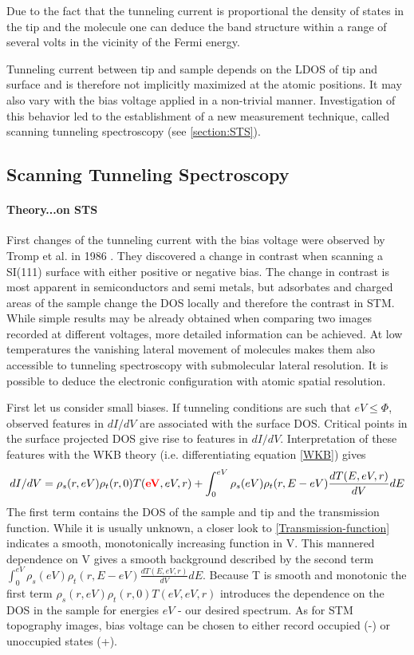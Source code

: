 Due to the fact that the tunneling current is proportional the density of states in the tip and the molecule one can deduce the band structure within a range of several volts in the vicinity of the Fermi energy.

Tunneling current between tip and sample depends on the LDOS of tip and surface and is therefore not implicitly maximized at the atomic positions. It may also vary with the bias voltage applied in a non-trivial manner. Investigation of this behavior led to the establishment of a new measurement technique, called scanning tunneling spectroscopy (see \autoref{section:STS}). 

\subsection{\textbf{S}canning \textbf{T}unneling \textbf{S}pectroscopy}
\paragraph{Theory...on STS}
\label{section:STS}
First changes of the tunneling current with the bias voltage were observed by Tromp et al. in 1986 \cite{tromp_atomic_1986}. They discovered a change in contrast when scanning a SI(111) surface with either positive or negative bias. The change in contrast is most apparent in semiconductors and semi metals\cite{bonnell_scanning_1993}, but adsorbates and charged areas of the sample change the DOS locally and therefore the contrast in STM. While simple results may be already obtained when comparing two images recorded at different voltages, more detailed information can be achieved. At low temperatures the vanishing lateral movement of molecules makes them also accessible to tunneling spectroscopy with submolecular lateral resolution. It is possible to deduce the electronic configuration with atomic spatial resolution.

First let us consider small biases.
If tunneling conditions are such that $eV\leq\Phi$, observed features in $dI/dV$ are associated with the surface DOS. Critical points in the surface projected DOS give rise to features in $dI/dV$. Interpretation of these features with the WKB theory (i.e. differentiating equation \eqref{WKB}) gives
$$dI/dV=\rho_s(r,eV)\rho_t(r,0)T(\textcolor{red}{\textbf{eV}},eV,r)+\int_0^{eV}\rho_s(eV)\rho_t(r,E-eV)\frac{dT(E,eV,r)}{dV}dE$$
The first term contains the DOS of the sample and tip and the transmission function. While it is usually unknown, a closer look to \eqref{Transmission-function} indicates a smooth, monotonically increasing function in V. This mannered dependence on V gives a smooth background described by the second term $\int_0^{eV}\rho_s(eV)\rho_t(r,E-eV)\frac{dT(E,eV,r)}{dV}dE$.
Because T is smooth and monotonic the first term $\rho_s(r,eV)\rho_t(r,0)T(eV,eV,r)$ introduces the dependence on the DOS in the sample for energies $eV$ - our desired spectrum. As for STM topography images, bias voltage can be chosen to either record occupied (-) or unoccupied states (+).


